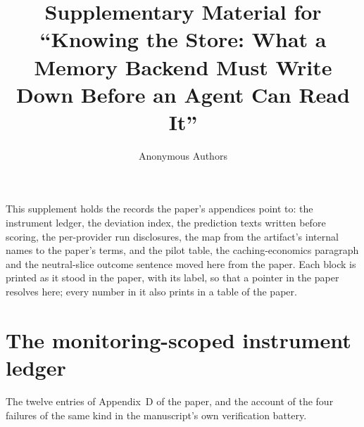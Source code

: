\documentclass{article}
\title{Supplementary Material for ``Knowing the Store: What a Memory Backend Must Write Down Before an Agent Can Read It''}
\author{Anonymous Authors}
\begin{document}
\maketitle

\noindent This supplement holds the records the paper's appendices point to: the instrument ledger, the deviation index, the prediction texts written before scoring, the per-provider run disclosures, the map from the artifact's internal names to the paper's terms, and the pilot table, the caching-economics paragraph and the neutral-slice outcome sentence moved here from the paper. Each block is printed as it stood in the paper, with its label, so that a pointer in the paper resolves here; every number in it also prints in a table of the paper.

\renewcommand{\thesection}{S.\arabic{section}}

\section{The monitoring-scoped instrument ledger}\label{sup:ledger}

The twelve entries of Appendix~D of the paper, and the account of the four failures of the same kind in the manuscript's own verification battery.
\end{document}
